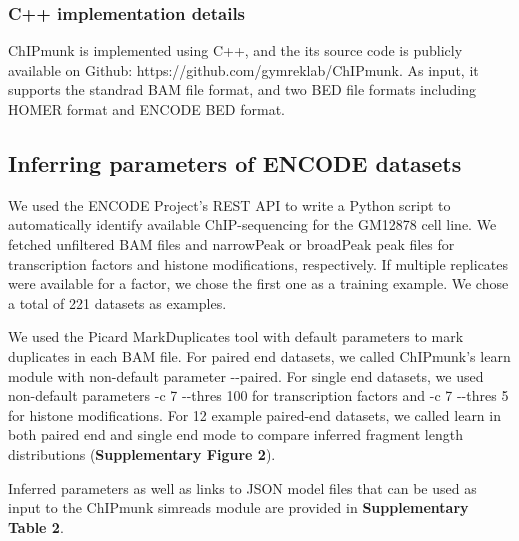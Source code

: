 \documentclass[12pt]{article}
\begin{document}
\subsubsection*{C++ implementation details}
ChIPmunk is implemented using C++, and the its source code is publicly available on Github: https://github.com/gymreklab/ChIPmunk.
As input, it supports the standrad BAM file format, and two BED file formats including HOMER format and ENCODE BED format.

\subsection*{Inferring parameters of ENCODE datasets}

We used the ENCODE Project's REST API to write a Python script to automatically identify available ChIP-sequencing for the GM12878 cell line.
We fetched unfiltered BAM files and narrowPeak or broadPeak peak files for transcription factors and histone modifications, respectively.
If multiple replicates were available for a factor, we chose the first one as a training example.
We chose a total of 221 datasets as examples.

We used the Picard \cite{picard} MarkDuplicates tool with default parameters to mark duplicates in each BAM file.
For paired end datasets, we called ChIPmunk's learn module with non-default parameter -{}-paired.
For single end datasets, we used non-default parameters -c 7 -{}-thres 100 for transcription factors and -c 7 -{}-thres 5 for histone modifications.
For 12 example paired-end datasets, we called learn in both paired end and single end mode to compare inferred fragment length distributions (\textbf{Supplementary Figure 2}).

Inferred parameters as well as links to JSON model files that can be used as input to the ChIPmunk simreads module are provided in \textbf{Supplementary Table 2}.



\end{document}
